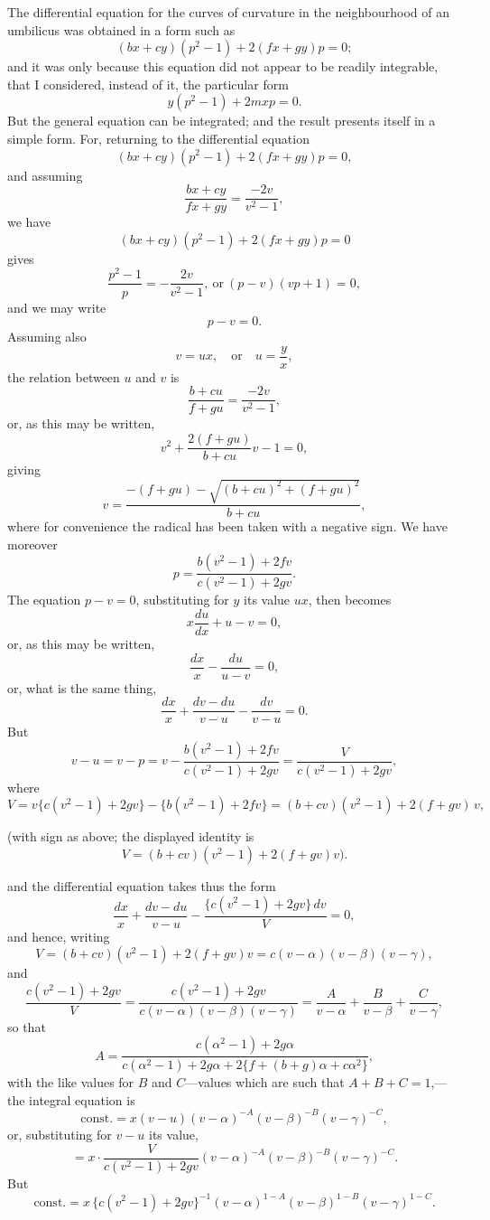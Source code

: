 \documentclass[11pt,a4paper]{article}
\theoremstyle{plain}
\begin{document}
The differential equation for the curves of curvature in the neighbourhood of an umbilicus was obtained in a form such as
\[
(b x + c y)(p^2 - 1) + 2(f x + g y)p = 0;
\]
\newpage
and it was only because this equation did not appear to be readily integrable, that I considered, instead of it, the particular form
\[
y(p^2 - 1) + 2 m x p = 0.
\]
But the general equation can be integrated; and the result presents itself in a simple form. For, returning to the differential equation
\[
(b x + c y)(p^2 - 1) + 2(f x + g y)p = 0,
\]
and assuming
\[
\frac{b x + c y}{f x + g y} = \frac{-2 v}{v^2 - 1},
\]
we have
\[
(b x + c y)(p^2 - 1) + 2(f x + g y)p = 0
\]
gives
\[
\frac{p^2 - 1}{p} = -\frac{2 v}{v^2 - 1},\ \text{or}\ (p - v)(v p + 1) = 0,
\]
and we may write
\[
p - v = 0.
\]
Assuming also
\[
v = u x,\quad \text{or}\quad u = \frac{y}{x},
\]
the relation between $u$ and $v$ is
\[
\frac{b + c u}{f + g u} = \frac{-2 v}{v^2 - 1},
\]
or, as this may be written,
\[
v^2 + \frac{2(f + g u)}{b + c u}v - 1 = 0,
\]
giving
\[
v = \frac{-(f + g u) - \sqrt{(b + c u)^2 + (f + g u)^2}}{b + c u},
\]
where for convenience the radical has been taken with a negative sign. We have moreover
\[
p = \frac{b(v^2 - 1) + 2 f v}{c(v^2 - 1) + 2 g v}.
\]
The equation $p - v = 0$, substituting for $y$ its value $u x$, then becomes
\[
x\frac{du}{dx} + u - v = 0,
\]
or, as this may be written,
\[
\frac{dx}{x} - \frac{du}{u - v} = 0,
\]
\newpage
or, what is the same thing,
\[
\frac{dx}{x} + \frac{dv - du}{v - u} - \frac{dv}{v - u} = 0.
\]
But
\[
v - u = v - p = v - \frac{b(v^2 - 1) + 2 f v}{c(v^2 - 1) + 2 g v} = \frac{V}{c(v^2 - 1) + 2 g v},
\]
where
\[
V = v\{c(v^2 - 1) + 2 g v\} - \{b(v^2 - 1) + 2 f v\} = (b + c v)(v^2 - 1) + 2(f + g v)\,v,
\]

\noindent (with sign as above; the displayed identity is
\[
V = (b + c v)(v^2 - 1) + 2(f + g v) v).
\]

and the differential equation takes thus the form
\[
\frac{dx}{x} + \frac{dv - du}{v - u} - \frac{\{c(v^2 - 1) + 2 g v\}\,dv}{V} = 0,
\]
and hence, writing
\[
V = (b + c v)(v^2 - 1) + 2(f + g v) v = c(v - \alpha)(v - \beta)(v - \gamma),
\]
and
\[
\frac{c(v^2 - 1) + 2 g v}{V} = \frac{c(v^2 - 1) + 2 g v}{c(v - \alpha)(v - \beta)(v - \gamma)} = \frac{A}{v - \alpha} + \frac{B}{v - \beta} + \frac{C}{v - \gamma},
\]
so that
\[
A = \frac{c(\alpha^2 - 1) + 2 g \alpha}{c(\alpha^2 - 1) + 2 g \alpha + 2\{f + (b + g)\alpha + c\alpha^2\}},
\]
with the like values for $B$ and $C$---values which are such that $A + B + C = 1$,---the integral equation is
\[
\text{const.} = x(v - u)(v - \alpha)^{-A}(v - \beta)^{-B}(v - \gamma)^{-C},
\]
or, substituting for $v - u$ its value,
\[
= x\cdot\frac{V}{c(v^2 - 1) + 2 g v}(v - \alpha)^{-A}(v - \beta)^{-B}(v - \gamma)^{-C}.
\]
But
\[
\text{const.} = x\,\{c(v^2 - 1) + 2 g v\}^{-1}(v - \alpha)^{1 - A}(v - \beta)^{1 - B}(v - \gamma)^{1 - C}.
\]
\end{document}
